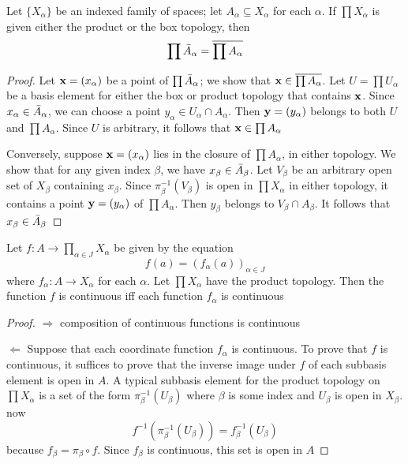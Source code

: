 \documentclass[11pt]{article}
\begin{document}
\begin{theorem}[]
\label{thm19.5}
Let \(\{X_\alpha\}\) be an indexed family of spaces; let \(A_\alpha\subseteq X_\alpha\)  for each \(\alpha\). If \(\prod X_\alpha\) is given
either the product or the box topology, then
\begin{equation*}
\prod \bar{A}_\alpha=\overline{\prod A_\alpha}
\end{equation*}
\end{theorem}

\begin{proof}
Let \(\operatorname{\textbf{x}}=(x_\alpha)\) be a point of \(\prod\bar{A}_\alpha\); we show that \(\operatorname{\textbf{x}}\in\overline{\prod A_\alpha}\). Let \(U=\prod U_\alpha\)  be a
basis element for either the box or product topology that contains \(\operatorname{\textbf{x}}\). Since \(x_\alpha\in\bar{A}_\alpha\),
we can choose a point \(y_\alpha\in U_\alpha\cap A_\alpha\). Then \(\operatorname{\textbf{y}}=(y_\alpha)\) belongs to both \(U\) and \(\prod A_\alpha\).
Since \(U\) is arbitrary, it follows that \(\operatorname{\textbf{x}}\in\prod A_\alpha\)

Conversely, suppose \(\operatorname{\textbf{x}}=(x_\alpha)\) lies in the closure of \(\prod A_\alpha\), in either topology. We show
that for any given index \(\beta\), we have \(x_\beta\in\bar{A}_\beta\). Let \(V_\beta\) be an arbitrary open set of \(X_\beta\)
containing \(x_\beta\). Since \(\pi_\beta^{-1}(V_\beta)\) is open in \(\prod X_\alpha\) in either topology, it contains a
point \(\operatorname{\textbf{y}}=(y_\alpha)\) of \(\prod A_\alpha\). Then \(y_\beta\) belongs to \(V_\beta\cap A_\beta\). It follows that \(x_\beta\in\bar{A}_\beta\)
\end{proof}

\begin{theorem}[]
\label{thm19.6}
Let \(f:A\to\prod_{\alpha\in J}X_\alpha\) be given by the equation
\begin{equation*}
f(a)=(f_\alpha(a))_{\alpha\in J}
\end{equation*}
where \(f_\alpha:A\to X_\alpha\) for each \(\alpha\). Let \(\prod X_\alpha\) have the product topology. Then the function \(f\)
is continuous iff each function \(f_\alpha\) is continuous
\end{theorem}

\begin{proof}
\(\Rightarrow\) composition of continuous functions is continuous

\(\Leftarrow\) Suppose that each coordinate function \(f_\alpha\) is continuous. To prove that \(f\) is
continuous, it suffices to prove that the inverse image under \(f\) of each subbasis element is
open in \(A\).  A typical subbasis element for the
product topology on \(\prod X_\alpha\) is a set of the form \(\pi_\beta^{-1}(U_\beta)\) where \(\beta\) is some index
and \(U_\beta\) is open in \(X_\beta\). now
\begin{equation*}
f^{-1}(\pi_\beta^{-1}(U_\beta))=f_\beta^{-1}(U_\beta)
\end{equation*}
because \(f_\beta=\pi_\beta\circ f\). Since \(f_\beta\) is continuous, this set is open in \(A\)
\end{proof}
\end{document}
